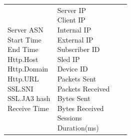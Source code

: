 \begin{description}
\begin{longtable}{p{}|p{}|p{}|p{}}
{                                                            Server ASN\\
                                                            Start Time\\
                                                            End Time\\
                                                            Http.Host\\
                                                            Http.Domain\\
                                                            Http.URL\\
                                                            SSL.SNI\\
                                                            SSL.JA3 hash\\
                                                            Receive Time}
                                            &   \tabincell{l}{Server IP\\
                                                                            Client IP\\
                                                                            Internal IP\\
                                                                            External IP\\
                                                                            Subscriber ID\\
                                                                            Sled IP\\
                                                                            Device ID\\
                                                                            Packets Sent\\
                                                                            Packets Received\\
                                                                            Bytes Sent\\
                                                                            Bytes Received\\
                                                                            Sessions\\
                                                                            Duration(ms)\\
}
\end{longtable}
\end{description}
